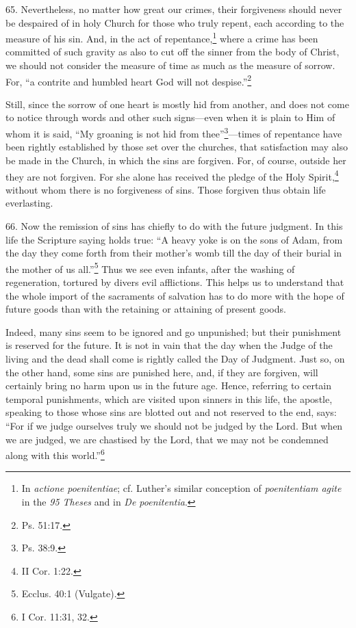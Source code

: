 65. Nevertheless, no matter how great our crimes, their forgiveness should never be despaired of in holy Church for those who truly repent, each according to the measure of his sin. And, in the act of repentance,\footnote{In \emph{actione poenitentiae}; cf. Luther's similar conception of \emph{poenitentiam agite} in the \emph{95 Theses} and in \emph{De poenitentia}.} where a crime has been committed of such gravity as also to cut off the sinner from the body of Christ, we should not consider the measure of time as much as the measure of sorrow. For, ``a contrite and humbled heart God will not despise.''\footnote{Ps. 51:17.}

Still, since the sorrow of one heart is mostly hid from another, and does not come to notice through words and other such signs—even when it is plain to Him of whom it is said, ``My groaning is not hid from thee''\footnote{Ps. 38:9.}—times of repentance have been rightly established by those set over the churches, that satisfaction may also be made in the Church, in which the sins are forgiven. For, of course, outside her they are not forgiven. For she alone has received the pledge of the Holy Spirit,\footnote{II Cor. 1:22.} without whom there is no forgiveness of sins. Those forgiven thus obtain life everlasting.

66. Now the remission of sins has chiefly to do with the future judgment. In this life the Scripture saying holds true: ``A heavy yoke is on the sons of Adam, from the day they come forth from their mother's womb till the day of their burial in the mother of us all.''\footnote{Ecclus. 40:1 (Vulgate).} Thus we see even infants, after the washing of regeneration, tortured by divers evil afflictions. This helps us to understand that the whole import of the sacraments of salvation has to do more with the hope of future goods than with the retaining or attaining of present goods.

Indeed, many sins seem to be ignored and go unpunished; but their punishment is reserved for the future. It is not in vain that the day when the Judge of the living and the dead shall come is rightly called the Day of Judgment. Just so, on the other hand, some sins are punished here, and, if they are forgiven, will certainly bring no harm upon us in the future age. Hence, referring to certain temporal punishments, which are visited upon sinners in this life, the apostle, speaking to those whose sins are blotted out and not reserved to the end, says: ``For if we judge ourselves truly we should not be judged by the Lord. But when we are judged, we are chastised by the Lord, that we may not be condemned along with this world.''\footnote{I Cor. 11:31, 32.}

